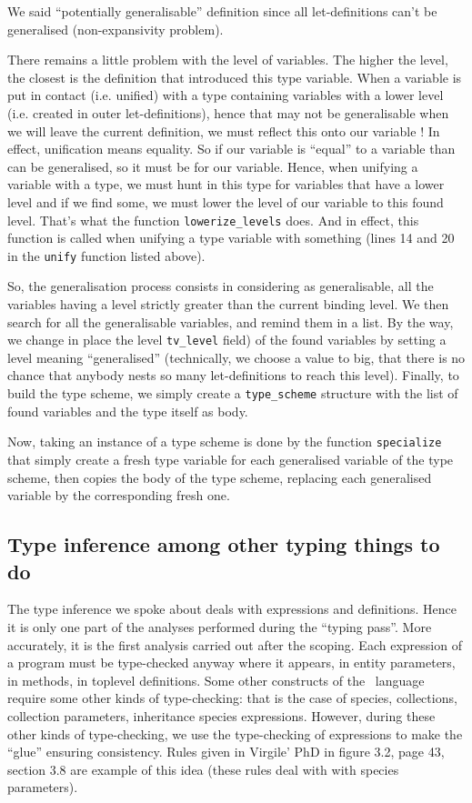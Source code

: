 We said ``potentially generalisable'' definition since all
let-definitions can't be generalised (non-expansivity problem).

There remains a little problem with the level of variables. The higher
the level, the closest is the definition that introduced this type
variable. When a variable is put in contact (i.e. unified) with a type
containing variables with a lower level (i.e. created in outer
let-definitions), hence that may not be generalisable when we will
leave the current definition, we must reflect this onto our variable !
In effect, unification means equality. So if our variable is ``equal''
to a variable than can be generalised, so it must be for our
variable. Hence, when unifying a variable with a type, we must hunt in
this type for variables that have a lower level and if we find some,
we must lower the level of our variable to this found level. That's
what the function {\tt lowerize\_levels} does. And in effect, this
function is called when unifying a type variable with something (lines 
14 and 20 in the {\tt unify} function listed above).


\medskip
So, the generalisation process consists in considering as
generalisable, all the variables having a level strictly greater than
the current binding level. We then search for all the generalisable
variables, and remind them in a list. By the way, we change in place
the level {\tt tv\_level} field) of the found variables by setting a
level meaning ``generalised'' (technically, we choose a value to big,
that there is no chance that anybody nests so many let-definitions to
reach this level). Finally, to build the type scheme, we simply
create a {\tt type\_scheme} structure with the list of found variables
and the type itself as body.

\medskip
Now, taking an instance of a type scheme is done by the function
{\tt specialize} that simply create a fresh type variable for each
generalised variable of the type scheme, then copies the body of the
type scheme, replacing each generalised variable by the corresponding
fresh one.


\subsection{Type inference among other typing things to do}
The type inference we spoke about deals with expressions and
definitions. Hence it is only one part of the analyses performed
during the ``typing pass''. More accurately, it is the first analysis
carried out after the scoping. Each expression of a program must be
type-checked anyway where it appears, in entity parameters, in
methods, in toplevel definitions. Some other constructs of the
\focalize\ language require some other kinds of type-checking: that is
the case of species, collections, collection parameters, inheritance
species expressions. However, during these other kinds of
type-checking, we use the type-checking of expressions to make the
``glue'' ensuring consistency. Rules given in Virgile' PhD in figure
3.2, page 43, section 3.8 are example of this idea (these rules deal
with with species parameters).

